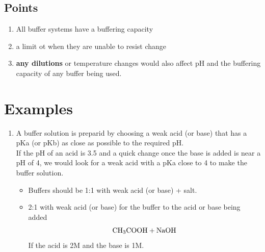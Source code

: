 \documentclass{article}
\begin{document}
\subsection{Points}
\begin{enumerate}
\item All buffer systems have a buffering capacity
\item a limit ot when they are unable to resist change
\item \textbf{any dilutions} or temperature changes would also affect pH and the buffering capacity of any buffer being used.
\end{enumerate}

\section{Examples}
\begin{enumerate}
\item A buffer solution is preparid by choosing a weak acid (or base) that has a pKa (or pKb) as close as possible to the required pH.\\ If the pH of an acid is 3.5 and a quick change once the base is added is near a pH of 4, we would look for a weak acid with a pKa close to 4 to make the buffer solution.
\begin{itemize}
\item Buffers should be 1:1 with weak acid (or base) + salt. 
\item 2:1 with weak acid (or base) for the buffer to the acid or base being added $$\ce{CH3COOH + NaOH}$$ If the acid is 2M and the base is 1M.
\end{itemize}
\end{enumerate}
\end{document}
